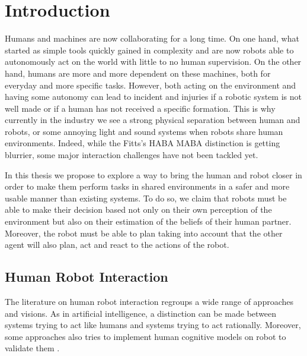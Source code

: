 \documentclass[a4paper,11pt,twoside]{StyleThese}
\begin{document}
\fi


\chapter*{Introduction}
Humans and machines are now collaborating for a long time. On one hand, what started as simple tools quickly gained in complexity and are now robots able to autonomously act on the world with little to no human supervision. On the other hand, humans are more and more dependent on these machines, both for everyday and more specific tasks.
However, both acting on the environment and having some autonomy can lead to incident and injuries if a robotic system is not well made or if a human has not received a specific formation. This is why currently in the industry we see a strong physical separation between human and robots, or some annoying light and sound systems when robots share human environments. Indeed, while the Fitts's HABA MABA \cite{fitts_human_1951} distinction is getting blurrier, some major interaction challenges have not been tackled yet.

In this thesis we propose to explore a way to bring the human and robot closer in order to make them perform tasks in shared environments in a safer and more usable manner than existing systems. To do so, we claim that robots must be able to make their decision based not only on their own perception of the environment but also on their estimation of the beliefs of their human partner. Moreover, the robot must be able to plan taking into account that the other agent will also plan, act and react to the actions of the robot.

\section*{Human Robot Interaction}
The literature on human robot interaction regroups a wide range of approaches and visions. As in artificial intelligence, a distinction can be made between systems trying to act like humans and systems trying to act rationally. Moreover, some approaches also tries to implement human cognitive models on robot to validate them \cite{act-R}.
\end{document}
